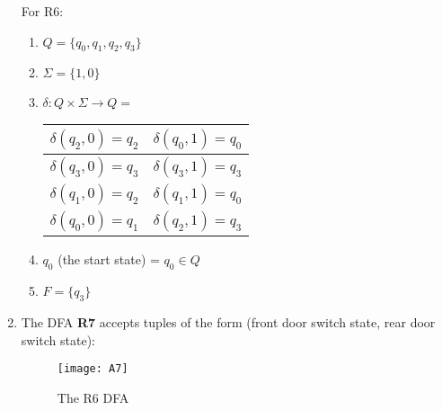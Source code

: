 \documentclass[11pt,a4paper]{article}
\begin{document}
\begin{enumerate}
                For R6:
                \begin{enumerate}
                    \item $Q = \{q_0, q_1, q_2, q_3\}$
                    \item $\Sigma = \{1, 0\}$
                    \item $\delta \colon Q \times \Sigma \rightarrow Q =$
                    \begin{tabular}{|c|c|}
                        \hline
                        $\delta(q_2, 0) = q_2$ & $\delta(q_0, 1) = q_0$ \\
                        \hline
                        $\delta(q_3, 0) = q_3$ & $\delta(q_3, 1) = q_3$ \\
                        \hline
                        $\delta(q_1, 0) = q_2$ & $\delta(q_1, 1) = q_0$ \\
                        \hline
                        $\delta(q_0, 0) = q_1$ & $\delta(q_2, 1) = q_3$ \\
                        \hline
                    \end{tabular}
                    \item $q_0$ (the start state) = $q_0 \in Q$
                    \item $F = \{q_3\}$
                \end{enumerate}

            \item The DFA \textbf{R7} accepts tuples of the form (front door switch state, rear door switch state):\\
            \begin{figure}[H]
                \centering
                \texttt{[image: A7]}
                \caption{The R6 DFA}
            \end{figure}


\end{enumerate}
\end{document}
